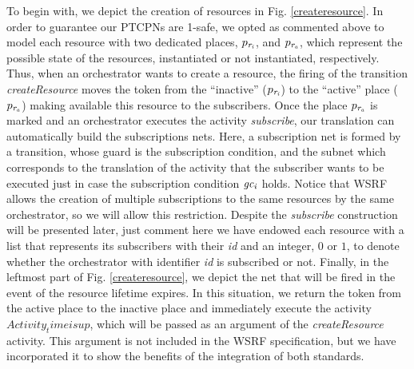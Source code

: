 To begin with, we depict the creation of resources in Fig. \ref{createresource}. In order to guarantee our PTCPNs are 1-safe, we opted as commented above to model each resource with two dedicated places,  $p_{\it r_i}$, and $p_{\it r_a}$, which represent the possible state of the resources, instantiated or not instantiated, respectively. Thus, when an orchestrator wants to create a resource, the firing of the transition {\it createResource} moves the token from the ``inactive'' ($p_{\it r_i}$) to the ``active'' place ($p_{\it r_a}$) making available this resource to the subscribers. Once the place $p_{\it r_a}$ is marked and an orchestrator executes the activity {\em subscribe}, our translation can automatically build the subscriptions nets. Here, a subscription net is formed by a transition, whose guard is the subscription condition, and the subnet which corresponds to the translation of the activity that the subscriber wants to be executed just in case the subscription condition ${\it gc_i}$ holds. Notice that WSRF allows the creation of multiple subscriptions to the same resources by the same orchestrator, so we will allow this restriction. Despite the {\em subscribe} construction will be presented later, just comment here we have endowed each resource with a list that represents its subscribers with their {\em id} and an integer, $0$ or $1$, to denote whether the orchestrator with identifier {\em id} is subscribed or not. Finally, in the leftmost part of Fig. \ref{createresource}, we depict the net that will be fired in the event of the resource lifetime expires. In this situation, we return the token from the active place to the inactive place and immediately execute the activity {\em $Activity_timeisup$}, which will be passed as an argument of the {\em createResource} activity. This argument is not included in the WSRF specification, but we have incorporated it to show the benefits of the integration of both standards.       

